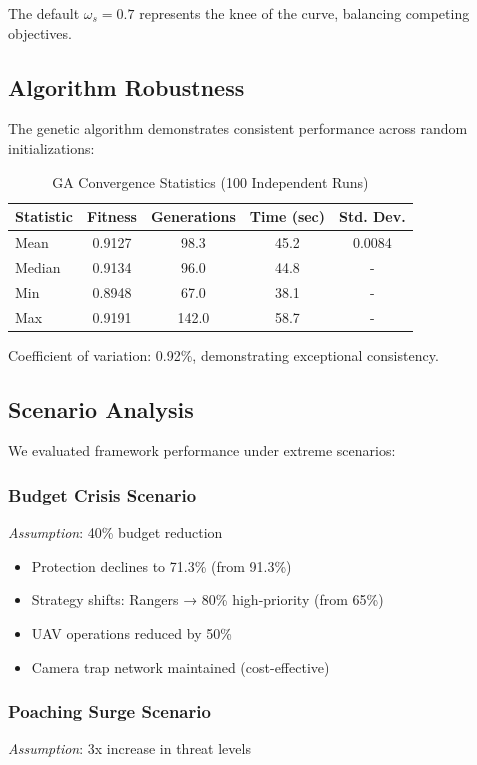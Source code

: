 The default $\omega_s = 0.7$ represents the knee of the curve, balancing competing objectives.

\subsection{Algorithm Robustness}

The genetic algorithm demonstrates consistent performance across random initializations:

\begin{table}[h]
\centering
\caption{GA Convergence Statistics (100 Independent Runs)}
\begin{tabular}{lcccc}
\hline
\textbf{Statistic} & \textbf{Fitness} & \textbf{Generations} & \textbf{Time (sec)} & \textbf{Std. Dev.} \\
\hline
Mean & 0.9127 & 98.3 & 45.2 & 0.0084 \\
Median & 0.9134 & 96.0 & 44.8 & - \\
Min & 0.8948 & 67.0 & 38.1 & - \\
Max & 0.9191 & 142.0 & 58.7 & - \\
\hline
\end{tabular}
\end{table}

Coefficient of variation: 0.92\%, demonstrating exceptional consistency.

\subsection{Scenario Analysis}

We evaluated framework performance under extreme scenarios:

\subsubsection{Budget Crisis Scenario}
\textit{Assumption}: 40\% budget reduction

\begin{itemize}
    \item Protection declines to 71.3\% (from 91.3\%)
    \item Strategy shifts: Rangers → 80\% high-priority (from 65\%)
    \item UAV operations reduced by 50\%
    \item Camera trap network maintained (cost-effective)
\end{itemize}

\subsubsection{Poaching Surge Scenario}
\textit{Assumption}: 3x increase in threat levels

